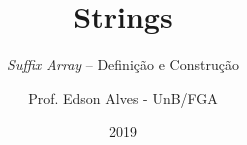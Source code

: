 \title{Strings}
\subtitle{{\it Suffix Array} -- Definição e Construção}
\author{Prof. Edson Alves - UnB/FGA}
\date{2019}
